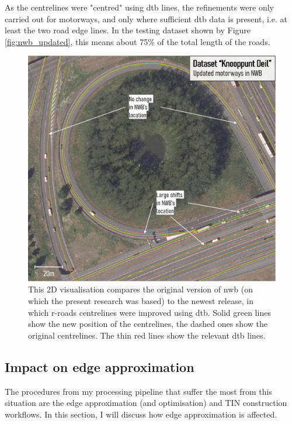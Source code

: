 As the centrelines were "centred" using \ac{dtb} lines, the refinements were only carried out for motorways, and only where sufficient \ac{dtb} data is present, i.e. at least the two road edge lines. In the testing dataset shown by Figure \ref{fig:nwb_updated}, this means about 75\% of the total length of the roads.

\begin{figure}
    \centering
    \includegraphics[width=\linewidth]{final_report/figs/nwb_updated_geometry.png}
    \caption[Figure illustrating recent NWB improvements]{This 2D visualisation compares the original version of \ac{nwb} (on which the present research was based) to the newest release, in which \ac{r-roads} centrelines were improved using \ac{dtb}. Solid green lines show the new position of the centrelines, the dashed ones show the original centrelines. The thin red lines show the relevant \ac{dtb} lines.}
    \label{fig:nwb_updated_geometry}
\end{figure}

\subsection{Impact on edge approximation}
\label{sub:nwb_updated_edgeapproximation}

The procedures from my processing pipeline that suffer the most from this situation are the edge approximation (and optimisation) and TIN construction workflows. In this section, I will discuss how edge approximation is affected.

